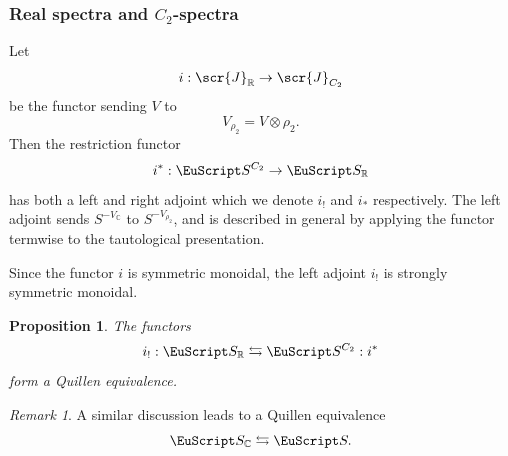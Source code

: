 \documentclass{amsart}
\newtheorem{prop}[equation]{Proposition}
\newtheorem{rem}[equation]{Remark}
\theoremstyle{definition}
\theoremstyle{remark}
\newtheorem{rem}[equation]{Remark}
\newcommand{\R}{{\mathbb R}}
\newcommand{\C}{\mathbb C}
\newcommand{\spectra}{\EuScript S}
\newcommand{\icat}{\scr{J}}
\newcommand{\igcat}[1]{\icat_{#1}}
\newcommand{\ugspectra}[1]{\spectra^{#1}}
\newcommand{\zt}{C_{2}}
\newcommand{\icatr}{\icat_{\R}}
\newcommand{\rspectra}{\spectra_{\R}}
\newcommand{\cspectra}{\spectra_{\C}}
\begin{document}
\subsubsection{Real spectra and $\zt$-spectra}
\label{sec:real-spectra-zt}
Let
\[
i:\icatr  \to \igcat{\zt} 
\]
be the functor sending $V$ to 
\[
V_{\rho_{2}} = V\otimes\rho_{2}.
\]
Then the restriction functor
\[
i^{\ast}:\ugspectra{\zt}\to \rspectra
\]
has both a left and right adjoint which we denote $i_{!}$ and
$i_{\ast}$ respectively.  The left adjoint sends $S^{-V_{\C}}$ to
$S^{-V_{\rho_{2}}}$, and is described in general by applying the
functor termwise to the tautological presentation.

Since the functor $i$ is symmetric monoidal, the left adjoint $i_{!}$ is
strongly symmetric monoidal.  

\begin{prop}
\label{thm:209}
The functors 
\[
i_{!}:\rspectra \leftrightarrows \ugspectra{\zt}:i^{\ast}
\]
form a Quillen equivalence. 
\end{prop}

\begin{rem}
\label{rem:70} 
A similar discussion leads to a Quillen equivalence
\[
\cspectra \leftrightarrows \spectra.
\]
\end{rem}
\end{document}
